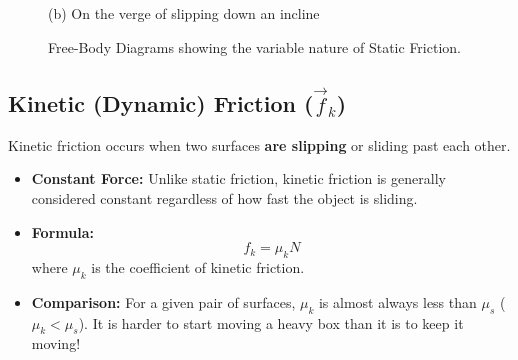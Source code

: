 \documentclass{article}
\begin{document}
\begin{figure}[h]
\begin{minipage}{0.45\textwidth}
        
        \vspace{0.2cm}
        \small (b) On the verge of slipping down an incline
    \end{minipage}
    
    \caption{Free-Body Diagrams showing the variable nature of Static Friction.}
\end{figure}

\subsection{Kinetic (Dynamic) Friction ($\vec{f}_k$)}
Kinetic friction occurs when two surfaces \textbf{are slipping} or sliding past each other.
\begin{itemize}
    \item \textbf{Constant Force:} Unlike static friction, kinetic friction is generally considered constant regardless of how fast the object is sliding.
    \item \textbf{Formula:} 
    \begin{equation}
        f_k = \mu_k N
    \end{equation}
    where $\mu_k$ is the coefficient of kinetic friction.
    \item \textbf{Comparison:} For a given pair of surfaces, $\mu_k$ is almost always less than $\mu_s$ ($\mu_k < \mu_s$). It is harder to start moving a heavy box than it is to keep it moving!
\end{itemize}
\end{document}
